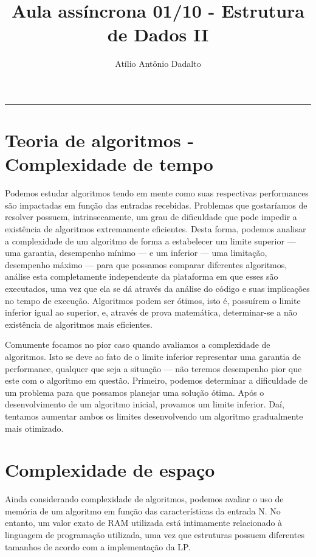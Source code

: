 \documentclass[a4paper, 12pt, brazil]{article}
\begin{document}
    \vspace{-5ex}
	\title{Aula assíncrona 01/10 - Estrutura de Dados II}
	\author{Atílio Antônio Dadalto}
	\date{}
	\maketitle
		\hrule
	
\section*{Teoria de algoritmos - Complexidade de tempo}
Podemos estudar algoritmos tendo em mente como suas respectivas performances são impactadas em função das entradas recebidas. Problemas que gostaríamos de resolver possuem, intrinsecamente, um grau de dificuldade que pode impedir a existência de algoritmos extremamente eficientes. Desta forma, podemos analisar a complexidade de um algoritmo de forma a estabelecer um limite superior --- uma garantia, desempenho mínimo --- e um inferior --- uma limitação, desempenho máximo --- para que possamos comparar diferentes algoritmos, análise esta completamente independente da plataforma em que esses são executados, uma vez que ela se dá através da análise do código e suas implicações no tempo de execução. Algoritmos podem ser ótimos, isto é, possuírem o limite inferior igual ao superior, e, através de prova matemática, determinar-se a não existência de algoritmos mais eficientes.

Comumente focamos no pior caso quando avaliamos a complexidade de algoritmos. Isto se deve ao fato de o limite inferior representar uma garantia de performance, qualquer que seja a situação --- não teremos desempenho pior que este com o algoritmo em questão. Primeiro, podemos determinar a dificuldade de um problema para que possamos planejar uma solução ótima. Após o desenvolvimento de um algoritmo inicial, provamos um limite inferior. Daí, tentamos aumentar ambos os limites desenvolvendo um algoritmo gradualmente mais otimizado.

\section*{Complexidade de espaço}
Ainda considerando complexidade de algoritmos, podemos avaliar o uso de memória de um algoritmo em função das características da entrada N. No entanto, um valor exato de RAM utilizada está intimamente relacionado à linguagem de programação utilizada, uma vez que estruturas possuem diferentes tamanhos de acordo com a implementação da LP.
\end{document}

